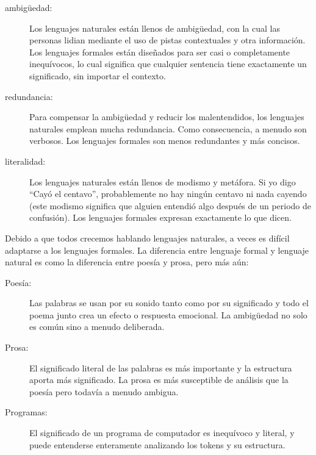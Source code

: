 \documentclass[10pt]{book}
\begin{document}
\begin{description}

\item[ambigüedad:] Los lenguajes naturales están llenos de ambigüedad, con la cual
las personas lidian mediante el uso de pistas contextuales y otra información.
Los lenguajes formales están diseñados para ser casi o completamente inequívocos,
lo cual significa que cualquier sentencia tiene exactamente un significado,
sin importar el contexto.

\item[redundancia:] Para compensar la ambigüedad y reducir
los malentendidos, los lenguajes naturales emplean mucha
redundancia.  Como consecuencia, a menudo son verbosos.  Los lenguajes formales
son menos redundantes y más concisos.

\item[literalidad:] Los lenguajes naturales están llenos de modismo y metáfora.
Si yo digo ``Cayó el centavo'', probablemente no hay ningún centavo ni
nada cayendo (este modismo significa que alguien entendió algo
después de un periodo de confusión).  Los lenguajes formales
expresan exactamente lo que dicen.

\end{description}

Debido a que todos crecemos hablando lenguajes naturales, a veces es
difícil adaptarse a los lenguajes formales.  La diferencia entre lenguaje formal
y lenguaje natural es como la diferencia entre poesía y prosa, pero
más aún:  

\begin{description}

\item[Poesía:] Las palabras se usan por su sonido tanto como por
su significado y todo el poema junto crea un efecto o
respuesta emocional.  La ambigüedad no solo es común sino a menudo
deliberada.

\item[Prosa:] El significado literal de las palabras es más importante
y la estructura aporta más significado.  La prosa es más susceptible de
análisis que la poesía pero todavía a menudo ambigua.

\item[Programas:] El significado de un programa de computador es inequívoco
y literal, y puede entenderse enteramente analizando los
tokens y su estructura.

\end{description}
\end{document}
